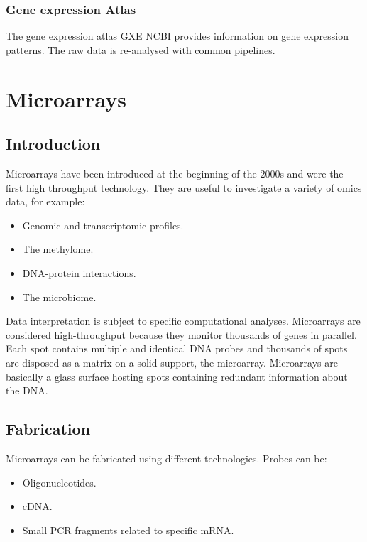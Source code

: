 		\subsubsection{Gene expression Atlas}
		The gene expression atlas GXE NCBI provides information on gene expression patterns.
		The raw data is re-analysed with common pipelines.




\section{Microarrays}

	\subsection{Introduction}
	Microarrays have been introduced at the beginning of the $2000$s and were the first high throughput technology.
	They are useful to investigate a variety of omics data, for example:

	\begin{multicols}{2}
		\begin{itemize}
			\item Genomic and transcriptomic profiles.
			\item The methylome.
			\item DNA-protein interactions.
			\item The microbiome.
		\end{itemize}
	\end{multicols}

	Data interpretation is subject to specific computational analyses.
	Microarrays are considered high-throughput because they monitor thousands of genes in parallel.
	Each spot contains multiple and identical DNA probes and thousands of spots are disposed as a matrix on a solid support, the microarray.
	Microarrays are basically a glass surface hosting spots containing redundant information about the DNA.

	\subsection{Fabrication}
	Microarrays can be fabricated using different technologies.
	Probes can be:

	\begin{multicols}{3}
		\begin{itemize}
			\item Oligonucleotides.
			\item cDNA.
			\item Small PCR fragments related to specific mRNA.
		\end{itemize}
	\end{multicols}

